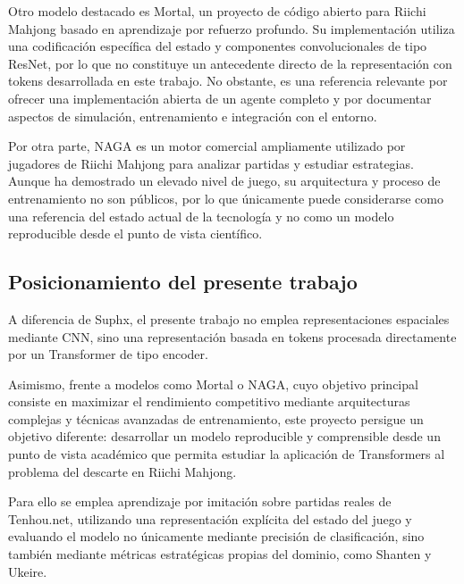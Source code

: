 Otro modelo destacado es Mortal\cite{mortal}, un proyecto de código abierto para Riichi Mahjong basado en aprendizaje por refuerzo profundo. Su implementación utiliza una codificación específica del estado y componentes convolucionales de tipo ResNet, por lo que no constituye un antecedente directo de la representación con tokens desarrollada en este trabajo. No obstante, es una referencia relevante por ofrecer una implementación abierta de un agente completo y por documentar aspectos de simulación, entrenamiento e integración con el entorno\cite{mortal_docs}.

Por otra parte, NAGA\cite{naga} es un motor comercial ampliamente utilizado por jugadores de Riichi Mahjong para analizar partidas y estudiar estrategias. Aunque ha demostrado un elevado nivel de juego, su arquitectura y proceso de entrenamiento no son públicos, por lo que únicamente puede considerarse como una referencia del estado actual de la tecnología y no como un modelo reproducible desde el punto de vista científico.

\subsection{Posicionamiento del presente trabajo}

A diferencia de Suphx, el presente trabajo no emplea representaciones espaciales mediante CNN, sino una representación basada en tokens procesada directamente por un Transformer de tipo encoder.

Asimismo, frente a modelos como Mortal o NAGA, cuyo objetivo principal consiste en maximizar el rendimiento competitivo mediante arquitecturas complejas y técnicas avanzadas de entrenamiento, este proyecto persigue un objetivo diferente: desarrollar un modelo reproducible y comprensible desde un punto de vista académico que permita estudiar la aplicación de Transformers al problema del descarte en Riichi Mahjong.

Para ello se emplea aprendizaje por imitación sobre partidas reales de Tenhou.net, utilizando una representación explícita del estado del juego y evaluando el modelo no únicamente mediante precisión de clasificación, sino también mediante métricas estratégicas propias del dominio, como Shanten y Ukeire.
